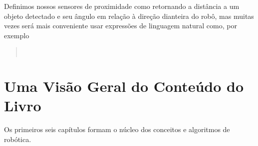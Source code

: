 Definimos nossos sensores de proximidade como retornando a distância a um objeto detectado e seu ângulo em relação à direção dianteira do robô, mas muitas vezes será mais conveniente usar expressões de linguagem natural como, por exemplo
\begin{quote}
\\
\end{quote}

\section{Uma Visão Geral do Conteúdo do Livro}\label{s.overview}

Os primeiros seis capítulos formam o núcleo dos conceitos e algoritmos de robótica.
